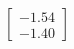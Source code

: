 \documentclass[preview]{standalone}
\begin{document}
\begin{align*}
\begin{bmatrix} -1.54 \\ -1.40 \end{bmatrix}
\end{align*}
\end{document}
